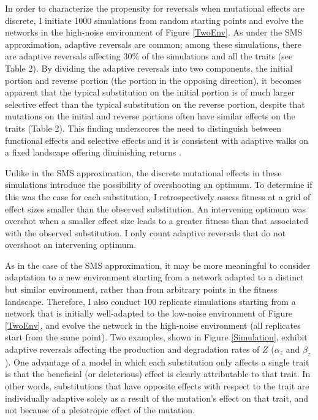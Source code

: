 \documentclass[dvips,12pt,twoside,titlepage]{article}
\begin{document}
In order to characterize the propensity for reversals when mutational effects are discrete, I initiate 1000 simulations from random starting points and evolve the networks in the high-noise environment of Figure \ref{TwoEnv}. 
As under the SMS approximation, adaptive reversals are common; among these simulations, there are adaptive reversals affecting 30\% of the simulations and all the traits (see Table 2). 
By dividing the adaptive reversals into two components, the initial portion and reverse portion (the portion in the opposing direction), it becomes apparent that the typical substitution on the initial portion is of much larger selective effect than the typical substitution on the reverse portion, despite that mutations on the initial and reverse portions often have similar effects on the traits (Table 2). 
This finding underscores the need to distinguish between functional effects and selective effects and it is consistent with adaptive walks on a fixed landscape offering diminishing returns \cite{Orr:2005p1460}.

Unlike in the SMS approximation, the discrete mutational effects in these simulations introduce the possibility of overshooting an optimum. To determine if this was the case for each substitution, I retrospectively assess fitness at a grid of effect sizes smaller than the observed substitution. An intervening optimum was overshot when a smaller effect size leads to a greater fitness than that associated with the observed substitution. I only count adaptive reversals that do not overshoot an intervening optimum.

As in the case of the SMS approximation, it may be more meaningful to consider adaptation to a new environment starting from a network adapted to a distinct but similar environment, rather than from arbitrary points in the fitness landscape.
Therefore, I also conduct 100 replicate simulations starting from a network that is initially well-adapted to the low-noise environment of Figure \ref{TwoEnv}, and evolve the network in the high-noise environment (all replicates start from the same point). 
Two examples, shown in Figure \ref{Simulation}, exhibit adaptive reversals affecting the production and degradation rates of $Z$ ($\alpha_{z}$ and $\beta_{z}$). 
One advantage of a model in which each substitution only affects a single trait is that the beneficial (or deleterious) effect is clearly attributable to that trait. 
In other words, substitutions that have opposite effects with respect to the trait are individually adaptive solely as a result of the mutation's effect on that trait, and not because of a pleiotropic effect of the mutation.
\end{document}
